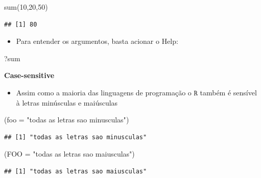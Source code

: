 \documentclass[
]{book}
\newenvironment{Shaded}{\begin{snugshade}}{\end{snugshade}}
\newcommand{\AttributeTok}[1]{\textcolor[rgb]{0.77,0.63,0.00}{#1}}
\newcommand{\DecValTok}[1]{\textcolor[rgb]{0.00,0.00,0.81}{#1}}
\newcommand{\FunctionTok}[1]{\textcolor[rgb]{0.00,0.00,0.00}{#1}}
\newcommand{\NormalTok}[1]{#1}
\newcommand{\StringTok}[1]{\textcolor[rgb]{0.31,0.60,0.02}{#1}}
\providecommand{\tightlist}{%
  \setlength{\itemsep}{0pt}\setlength{\parskip}{0pt}}
\begin{document}
\begin{Shaded}
\begin{Highlighting}[]
\FunctionTok{sum}\NormalTok{(}\DecValTok{10}\NormalTok{,}\DecValTok{20}\NormalTok{,}\DecValTok{50}\NormalTok{)}
\end{Highlighting}
\end{Shaded}

\begin{verbatim}
## [1] 80
\end{verbatim}

\begin{itemize}
\tightlist
\item
  Para entender os argumentos, basta acionar o Help:
\end{itemize}

\begin{Shaded}
\begin{Highlighting}[]
\NormalTok{?sum}
\end{Highlighting}
\end{Shaded}

\textbf{Case-sensitive}

\begin{itemize}
\tightlist
\item
  Assim como a maioria das linguagens de programação o \(\texttt{R}\) também é sensível à letras minúsculas e maiúsculas
\end{itemize}

\begin{Shaded}
\begin{Highlighting}[]
\NormalTok{(}\AttributeTok{foo =} \StringTok{"todas as letras sao minusculas"}\NormalTok{)}
\end{Highlighting}
\end{Shaded}

\begin{verbatim}
## [1] "todas as letras sao minusculas"
\end{verbatim}

\begin{Shaded}
\begin{Highlighting}[]
\NormalTok{(}\AttributeTok{FOO =} \StringTok{"todas as letras sao maiusculas"}\NormalTok{)}
\end{Highlighting}
\end{Shaded}

\begin{verbatim}
## [1] "todas as letras sao maiusculas"
\end{verbatim}
\end{document}
